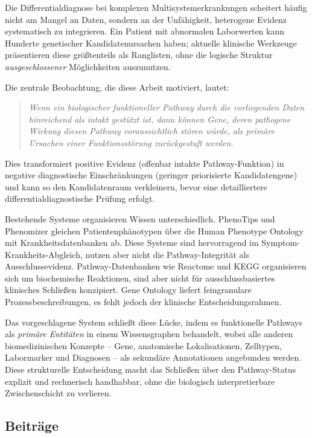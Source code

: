 \documentclass[12pt,a4paper]{article}
\begin{document}
Die Differentialdiagnose bei komplexen Multisystemerkrankungen scheitert häufig nicht am Mangel an Daten, sondern an der Unfähigkeit, heterogene Evidenz systematisch zu integrieren. Ein Patient mit abnormalen Laborwerten kann Hunderte genetischer Kandidatenursachen haben; aktuelle klinische Werkzeuge präsentieren diese größtenteils als Ranglisten, ohne die logische Struktur \emph{ausgeschlossener} Möglichkeiten auszunutzen.

Die zentrale Beobachtung, die diese Arbeit motiviert, lautet:

\begin{quote}
\emph{Wenn ein biologischer funktioneller Pathway durch die vorliegenden Daten hinreichend als intakt gestützt ist, dann können Gene, deren pathogene Wirkung diesen Pathway voraussichtlich stören würde, als primäre Ursachen einer Funktionsstörung zurückgestuft werden.}
\end{quote}

Dies transformiert positive Evidenz (offenbar intakte Pathway-Funktion) in negative diagnostische Einschränkungen (geringer priorisierte Kandidatengene) und kann so den Kandidatenraum verkleinern, bevor eine detailliertere differentialdiagnostische Prüfung erfolgt.

Bestehende Systeme organisieren Wissen unterschiedlich. PhenoTips \citep{Girdea2013} und Phenomizer \citep{Kohler2009} gleichen Patientenphänotypen über die Human Phenotype Ontology \citep{Robinson2008} mit Krankheitsdatenbanken ab. Diese Systeme sind hervorragend im Symptom-Krankheits-Abgleich, nutzen aber nicht die Pathway-Integrität als Ausschlussevidenz. Pathway-Datenbanken wie Reactome \citep{Fabregat2018} und KEGG \citep{Kanehisa2023} organisieren sich um biochemische Reaktionen, sind aber nicht für ausschlussbasiertes klinisches Schließen konzipiert. Gene Ontology \citep{Ashburner2000} liefert feingranulare Prozessbeschreibungen, es fehlt jedoch der klinische Entscheidungsrahmen.

Das vorgeschlagene System schließt diese Lücke, indem es funktionelle Pathways als \emph{primäre Entitäten} in einem Wissensgraphen behandelt, wobei alle anderen biomedizinischen Konzepte -- Gene, anatomische Lokalisationen, Zelltypen, Labormarker und Diagnosen -- als sekundäre Annotationen angebunden werden. Diese strukturelle Entscheidung macht das Schließen über den Pathway-Status explizit und rechnerisch handhabbar, ohne die biologisch interpretierbare Zwischenschicht zu verlieren.

\subsection{Beiträge}
\end{document}
